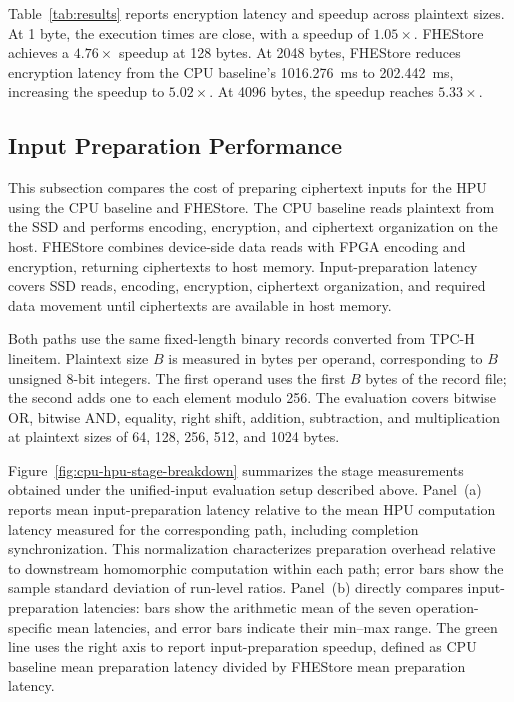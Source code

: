 \documentclass[sigconf,anonymous,balance=false]{acmart}
\newcommand{\bodypar}{\par\vskip 0pt plus 6pt\relax}
\begin{document}
Table~\ref{tab:results} reports encryption latency and speedup across plaintext sizes. At 1 byte, the execution times are close, with a speedup of $1.05\times$. FHEStore achieves a $4.76\times$ speedup at 128 bytes. At 2048 bytes, FHEStore reduces encryption latency from the CPU baseline's 1016.276~ms to 202.442~ms, increasing the speedup to $5.02\times$. At 4096 bytes, the speedup reaches $5.33\times$.
\bodypar

\subsection{Input Preparation Performance}
\label{sec:peripheral-overhead}
This subsection compares the cost of preparing ciphertext inputs for the HPU using the CPU baseline and FHEStore. The CPU baseline reads plaintext from the SSD and performs encoding, encryption, and ciphertext organization on the host. FHEStore combines device-side data reads with FPGA encoding and encryption, returning ciphertexts to host memory. Input-preparation latency covers SSD reads, encoding, encryption, ciphertext organization, and required data movement until ciphertexts are available in host memory.
\bodypar

Both paths use the same fixed-length binary records converted from TPC-H lineitem. Plaintext size $B$ is measured in bytes per operand, corresponding to $B$ unsigned 8-bit integers. The first operand uses the first $B$ bytes of the record file; the second adds one to each element modulo 256. The evaluation covers bitwise OR, bitwise AND, equality, right shift, addition, subtraction, and multiplication at plaintext sizes of 64, 128, 256, 512, and 1024 bytes.
\bodypar

Figure~\ref{fig:cpu-hpu-stage-breakdown} summarizes the stage measurements obtained under the unified-input evaluation setup described above. Panel~(a) reports mean input-preparation latency relative to the mean HPU computation latency measured for the corresponding path, including completion synchronization. This normalization characterizes preparation overhead relative to downstream homomorphic computation within each path; error bars show the sample standard deviation of run-level ratios. Panel~(b) directly compares input-preparation latencies: bars show the arithmetic mean of the seven operation-specific mean latencies, and error bars indicate their min--max range. The green line uses the right axis to report input-preparation speedup, defined as CPU baseline mean preparation latency divided by FHEStore mean preparation latency.
\bodypar
\end{document}
